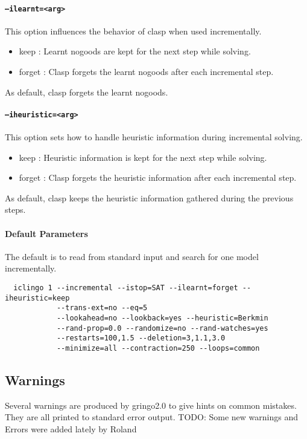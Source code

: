 \documentclass[a4paper,10pt]{article}
\begin{document}
\paragraph{\texttt{--ilearnt=<arg>}}
This option influences the behavior of clasp when used incrementally.
\begin{itemize}
 \item keep   : Learnt nogoods are kept for the next step while solving.
 \item forget : Clasp forgets the learnt nogoods after each incremental step.
\end{itemize}
As default, clasp forgets the learnt nogoods.
\paragraph{\texttt{--iheuristic=<arg>}}
This option sets how to handle heuristic information during incremental solving.
\begin{itemize}
 \item keep   : Heuristic information is kept for the next step while solving.
 \item forget : Clasp forgets the heuristic information after each incremental step.
\end{itemize}
As default, clasp keeps the heuristic information gathered during the previous steps.
\paragraph{Default Parameters}
The default is to read from standard input and search for one model incrementally.
\begin{verbatim}
  iclingo 1 --incremental --istop=SAT --ilearnt=forget --iheuristic=keep
            --trans-ext=no --eq=5 
            --lookahead=no --lookback=yes --heuristic=Berkmin
            --rand-prop=0.0 --randomize=no --rand-watches=yes
            --restarts=100,1.5 --deletion=3,1.1,3.0
            --minimize=all --contraction=250 --loops=common

\end{verbatim}


\subsection{Warnings}
Several warnings are produced by gringo2.0 to give hints on common mistakes.
They are all printed to standard error output.
TODO: Some new warnings and Errors were added lately by Roland
\end{document}

